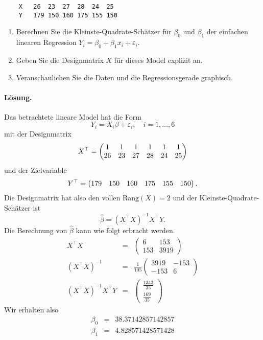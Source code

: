 \begin{lstlisting}
    X   26  23  27  28  24  25
    Y   179 150 160 175 155 150
\end{lstlisting}
\begin{enumerate}
    \item Berechnen Sie die Kleinste-Quadrate-Schätzer für $\beta_0$ und $\beta_1$
        der einfachen linearen Regression $Y_i = \beta_0 + \beta_1 x_i + \varepsilon_i$.
    \item Geben Sie die Designmatrix $X$ für dieses Model explizit an.
    \item Veranschaulichen Sie die Daten und die Regressionsgerade graphisch.
\end{enumerate}

\paragraph*{Lösung.  } Das betrachtete lineare Model hat die Form
\begin{equation*}
    Y_i = X_i \beta + \varepsilon_i, \quad i=1,\ldots, 6
\end{equation*}
mit der Designmatrix
$$ X^\top = \left(\begin{matrix} 1&1&1&1&1&1\cr 26&23&27&28&24&25\cr \end{matrix} \right) $$
und der Zielvariable
\begin{equation*}
    Y^\top = \left( \begin{matrix} 179&150&160&175&155&150\cr   \end{matrix}  \right).
\end{equation*}
Die Designmatrix hat also den vollen $\textrm{Rang}(X)=2$ und der Kleinste-Quadrate-Schätzer
ist 
\begin{equation*}
    \hat \beta = \left( X^\top X \right)^{-1} X^\top Y.
\end{equation*}
Die Berechnung von $\hat \beta$ kann wie folgt erbracht werden. 
\begin{eqnarray*}
    X^\top X &=&  
    \left( {
    \begin{array}{cc}
        6 & 153 \\ 153 & 3919
    \end{array} }
    \right) \\
    \left(  X^\top X\right)^{-1} &=& \frac{1}{105} 
    \left( {
    \begin{array}{cc} 
        3919&-153 \\ -153&6
    \end{array} }
    \right) \\
    \left(  X^\top X\right)^{-1} X^\top Y &=& \left(
    \begin{array}{c}
        \frac{1343}{35} \\ \frac{169}{35}
    \end{array}
    \right)
\end{eqnarray*}
Wir erhalten also 
\begin{eqnarray*}
    \beta_0 &=&  38.37142857142857 \\
    \beta_1 &=&  4.828571428571428
\end{eqnarray*}

